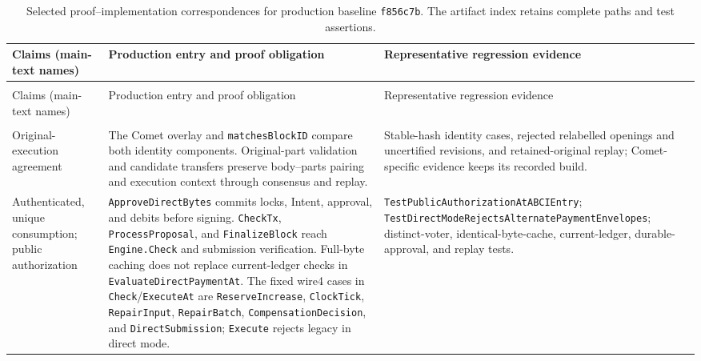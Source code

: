 \begin{longtable}{@{}
    >{\raggedright\arraybackslash}p{}
    >{\raggedright\arraybackslash}p{}
    >{\raggedright\arraybackslash}p{}
    @{}}
\caption{Selected proof--implementation correspondences for production baseline \texttt{f856c7b}. The artifact index retains complete paths and test assertions.}
\label{tab:proof-implementation}\\
\toprule
Claims (main-text names) &
Production entry and proof obligation &
Representative regression evidence \\
\midrule
\endfirsthead

\multicolumn{3}{@{}l}{Table~\thetable\ (continued)}\\
\toprule
Claims (main-text names) &
Production entry and proof obligation &
Representative regression evidence \\
\midrule
\endhead

\midrule
\multicolumn{3}{r@{}}{Continued on next page}\\
\endfoot

\bottomrule
\endlastfoot

Original-execution agreement &
The Comet overlay and \texttt{matchesBlockID} compare both identity
components. Original-part validation and candidate transfers preserve
body--parts pairing and execution context through consensus and replay. &
Stable-hash identity cases, rejected relabelled openings and uncertified
revisions, and retained-original replay; Comet-specific evidence keeps
its recorded build. \\

Authenticated, unique consumption;
public authorization &
\texttt{ApproveDirectBytes} commits locks, Intent, approval, and debits
before signing. \texttt{CheckTx}, \texttt{ProcessProposal}, and
\texttt{FinalizeBlock} reach \texttt{Engine.Check} and submission
verification. Full-byte caching does not replace current-ledger checks
in \texttt{EvaluateDirectPaymentAt}. The fixed wire4 cases in
\texttt{Check}/\texttt{ExecuteAt} are \texttt{ReserveIncrease},
\texttt{ClockTick}, \texttt{RepairInput}, \texttt{RepairBatch},
\texttt{CompensationDecision}, and \texttt{DirectSubmission};
\texttt{Execute} rejects legacy in direct mode. &
\texttt{TestPublicAuthorization\allowbreak AtABCIEntry};
\texttt{TestDirectModeRejects\allowbreak AlternatePayment\allowbreak Envelopes}; distinct-voter, identical-byte-cache, current-ledger, durable-approval,
and replay tests. \\


\end{longtable}
